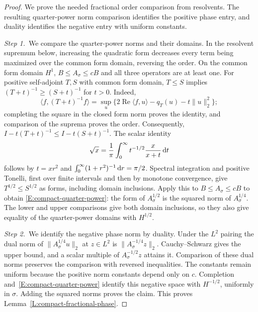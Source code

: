 \begin{proof}
  We prove the needed fractional order comparison from resolvents. The
  resulting quarter-power norm comparison identifies the positive phase entry,
  and duality identifies the negative entry with uniform constants.

  \medskip
  \noindent\textit{Step 1.~}We compare the quarter-power norms and their
  domains.
  In the resolvent supremum below, increasing the quadratic form decreases
  every term being maximized over the common form domain, reversing the order.
  On the common form domain $H^1$, $B \le A_\sigma \le cB$ and all three
  operators are at least one. For positive self-adjoint $T,S$ with common form
  domain, $T \le S$ implies $(T+t)^{-1} \ge (S+t)^{-1}$ for $t > 0$. Indeed,
  \[
    \langle f,(T+t)^{-1}f\rangle
    =\sup_u\{2\operatorname{Re}\langle f,u\rangle
    -q_T(u)-t\|u\|_2^2\};
  \]
  completing the square in the closed form norm proves the identity, and
  comparison of the suprema proves the order. Consequently, $I-t(T+t)^{-1} \le
  I-t(S+t)^{-1}$. The scalar identity
  \[
    \sqrt x=\frac1\pi\int_0^\infty
    t^{-1/2}\frac{x}{x+t}\,\mathrm{d} t
  \]
  follows by $t = xr^2$ and $\int_0^\infty(1+r^2)^{-1}\,\mathrm{d} r = \pi/2$. Spectral
  integration and positive Tonelli, first over finite intervals and then by
  monotone convergence, give $T^{1/2} \le S^{1/2}$ as forms, including domain
  inclusions. Apply this to $B \le A_\sigma \le cB$ to obtain
  \eqref{E:compact-quarter-power}: the form of $A_\sigma^{1/2}$ is the squared
  norm of $A_\sigma^{1/4}$. The lower and upper comparisons give both domain
  inclusions, so they also give
  equality of the quarter-power domains with
  $H^{1/2}$.


  \medskip
  \noindent\textit{Step 2.~}We identify the negative phase norm by duality.
  Under the $L^2$ pairing the dual norm of $\|A_\sigma^{1/4}u\|_2$ at $z \in
  L^2$ is $\|A_\sigma^{-1/4}z\|_2$. Cauchy--Schwarz gives the upper bound, and a
  scalar multiple of $A_\sigma^{-1/2}z$ attains it. Comparison
  of these dual norms preserves the comparison with reversed inequalities. The
  constants remain uniform because the positive norm constants depend only on
  $c$. Completion
  and~\eqref{E:compact-quarter-power} identify this negative space with
  $H^{-1/2}$, uniformly in $\sigma$. Adding the squared norms proves the claim.
  This proves Lemma~\ref{L:compact-fractional-phase}.
\end{proof}

